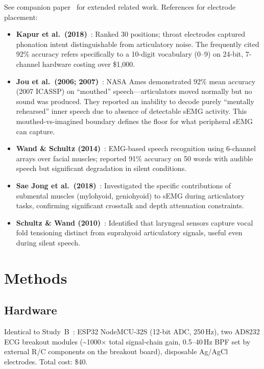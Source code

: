 \documentclass[11pt, a4paper]{article}
\begin{document}
See companion paper~\cite{kho2026companion} for extended related work. References for electrode placement:
\begin{itemize}
    \item \textbf{Kapur et al.\ (2018)}~\cite{kapur2018}: Ranked 30 positions; throat electrodes captured phonation intent distinguishable from articulatory noise. The frequently cited 92\% accuracy refers specifically to a 10-digit vocabulary (0--9) on 24-bit, 7-channel hardware costing over \$1{,}000.
    \item \textbf{Jou et al.\ (2006; 2007)}~\cite{jou2006,jou2007}: NASA Ames demonstrated 92\% mean accuracy (2007 ICASSP) on ``mouthed'' speech---articulators moved normally but no sound was produced. They reported an inability to decode purely ``mentally rehearsed'' inner speech due to absence of detectable sEMG activity. This mouthed-vs-imagined boundary defines the floor for what peripheral sEMG can capture.
    \item \textbf{Wand \& Schultz (2014)}~\cite{wand2014}: EMG-based speech recognition using 6-channel arrays over facial muscles; reported 91\% accuracy on 50 words with audible speech but significant degradation in silent conditions.
    \item \textbf{Sae Jong et al.\ (2018)}~\cite{saejong2018}: Investigated the specific contributions of submental muscles (mylohyoid, geniohyoid) to sEMG during articulatory tasks, confirming significant crosstalk and depth attenuation constraints.
    \item \textbf{Schultz \& Wand (2010)}~\cite{schultz2010}: Identified that laryngeal sensors capture vocal fold tensioning distinct from suprahyoid articulatory signals, useful even during silent speech.
\end{itemize}

\section{Methods}

\subsection{Hardware}

Identical to Study~B~\cite[{\S}2.1]{kho2026companion}: ESP32 NodeMCU-32S (12-bit ADC, 250\,Hz), two AD8232 ECG breakout modules (\textasciitilde1000$\times$ total signal-chain gain, 0.5--40\,Hz BPF set by external R/C components on the breakout board), disposable Ag/AgCl electrodes. Total cost: \$40.
\end{document}
